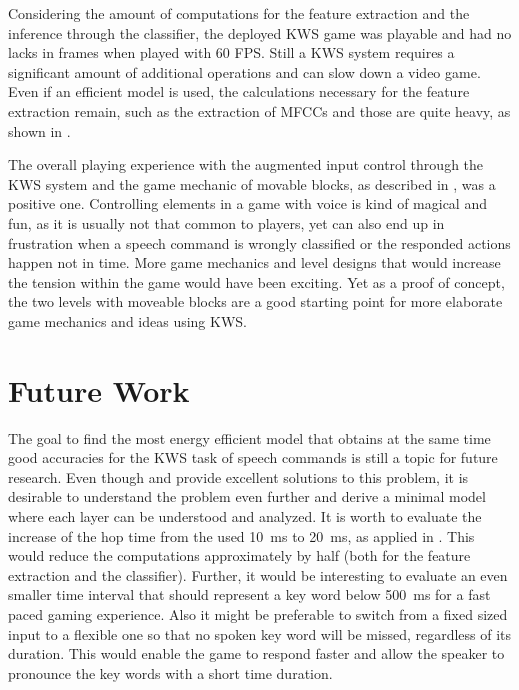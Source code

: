 Considering the amount of computations for the feature extraction and the inference through the classifier, the deployed KWS game was playable and had no lacks in frames when played with 60 FPS.
Still a KWS system requires a significant amount of additional operations and can slow down a video game.
Even if an efficient model is used, the calculations necessary for the feature extraction remain, such as the extraction of MFCCs and those are quite heavy, as shown in .

The overall playing experience with the augmented input control through the KWS system and the game mechanic of movable blocks, as described in , was a positive one.
Controlling elements in a game with voice is kind of magical and fun, as it is usually not that common to players, yet can also end up in frustration when a speech command is wrongly classified or the responded actions happen not in time.
More game mechanics and level designs that would increase the tension within the game would have been exciting.
Yet as a proof of concept, the two levels with moveable blocks are a good starting point for more elaborate game mechanics and ideas using KWS.



\section{Future Work}
The goal to find the most energy efficient model that obtains at the same time good accuracies for the KWS task of speech commands is still a topic for future research.
Even though \cite{Zhang2017} and \cite{Peter2020} provide excellent solutions to this problem, it is desirable to understand the problem even further and derive a minimal model where each layer can be understood and analyzed.
It is worth to evaluate the increase of the hop time from the used \SI{10}{\milli\second} to \SI{20}{\milli\second}, as applied in \cite{Peter2020}.
This would reduce the computations approximately by half (both for the feature extraction and the classifier).
Further, it would be interesting to evaluate an even smaller time interval that should represent a key word below \SI{500}{\milli\second} for a fast paced gaming experience.
Also it might be preferable to switch from a fixed sized input to a flexible one so that no spoken key word will be missed, regardless of its duration.
This would enable the game to respond faster and allow the speaker to pronounce the key words with a short time duration.


